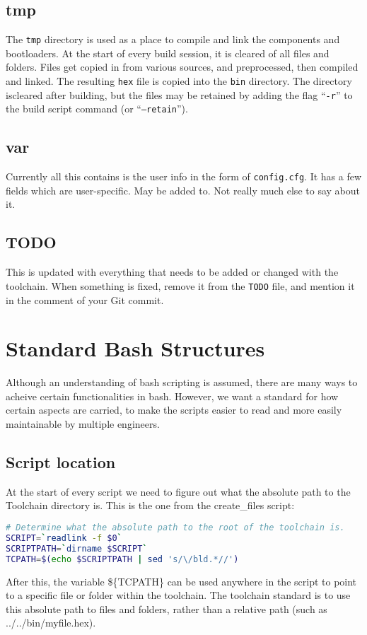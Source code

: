 \documentclass[a4paper, oneside, 11pt, titlepage, onecolumn, openright]{report}
\begin{document}
\section{tmp}
			\label{s:tmp}
			The \texttt{tmp} directory is used as a place to compile and link the components and bootloaders. At the start of every build session, it is cleared of all files and folders. Files get copied in from various sources, and preprocessed, then compiled and linked. The resulting \texttt{hex} file is copied into the \texttt{bin} directory. 
			The directory iscleared after building, but the files may be retained by adding the flag ``\texttt{-r}'' to the build script command (or ``\texttt{--retain}'').
			
\section{var}
			\label{s:var}
			Currently all this contains is the user info in the form of \texttt{config.cfg}. It has a few fields which are user-specific. May be added to. Not really much else to say about it.
			
\section{TODO}
			\label{s:TODO}
			This is updated with everything that needs to be added or changed with the toolchain. When something is fixed, remove it from the \texttt{TODO} file, and mention it in the comment of your Git commit.
\pagebreak			
\chapter{Standard Bash Structures}
			\label{C:BashStructures}
			Although an understanding of bash scripting is assumed, there are many ways to acheive certain functionalities in bash. However, we want a standard for how certain aspects are carried, to make the scripts easier to read and more easily maintainable by multiple engineers.
			
\section{Script location}
			\label{s:ScriptLocation}
			At the start of every script we need to figure out what the absolute path to the Toolchain directory is. This is the one from the create\_files script:
			
\begin{lstlisting}[frame=trBL, breaklines=true, language = bash]
# Determine what the absolute path to the root of the toolchain is.
SCRIPT=`readlink -f $0`
SCRIPTPATH=`dirname $SCRIPT`
TCPATH=$(echo $SCRIPTPATH | sed 's/\/bld.*//')
\end{lstlisting}
After this, the variable \$\{TCPATH\} can be used anywhere in the script to point to a specific file or folder within the toolchain. The toolchain standard is to use this absolute path to files and folders, rather than a relative path (such as ../../bin/myfile.hex).
			
\end{document}
